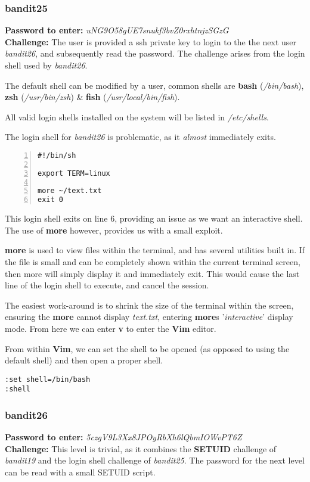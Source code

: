 \documentclass[a4paper]{article}
\newcommand{\pass}[1]{\textbf{Password to enter:} \textit{#1}\\}
\newcommand{\chall}{\textbf{Challenge:} }
\begin{document}
\subsubsection{bandit25}
\pass{uNG9O58gUE7snukf3bvZ0rxhtnjzSGzG}
\chall The user is provided a ssh private key to login to the the next user \textit{bandit26}, and subsequently read the password. The challenge arises from the login shell used by \textit{bandit26}.

The default shell can be modified by a user, common shells are \textbf{bash}  (\textit{/bin/bash}), \textbf{zsh} (\textit{/usr/bin/zsh}) \& \textbf{fish} (\textit{/usr/local/bin/fish}).

All valid login shells installed on the system will be listed in \textit{/etc/shells}.

The login shell for \textit{bandit26} is problematic, as it \textit{almost} immediately exits.
\begin{lstlisting}[title=login shell for bandit26\, /usr/bin/showtext, numbers=left]
#!/bin/sh

export TERM=linux

more ~/text.txt
exit 0
\end{lstlisting}

This login shell exits on line 6, providing an issue as we want an interactive shell. The use of \textbf{more} however, provides us with a small exploit.

\textbf{more} is used to view files within the terminal, and has several utilities built in. If the file is small and can be completely shown within the current terminal screen, then more will simply display it and immediately exit. This would cause the last line of the login shell to execute, and cancel the session.

The easiest work-around is to shrink the size of the terminal within the screen, ensuring the \textbf{more} cannot display \textit{text.txt}, entering \textbf{more}s '\textit{interactive}' display mode. From here we can enter \textbf{v} to enter the \textbf{Vim} editor.

From within \textbf{Vim}, we can set the shell to be opened (as opposed to using the default shell) and then open a proper shell.
\begin{lstlisting}[title=How to start a specific shell from vim, deletekeywords={set}]
:set shell=/bin/bash
:shell
\end{lstlisting}

\subsubsection{bandit26}
\pass{5czgV9L3Xx8JPOyRbXh6lQbmIOWvPT6Z}
\chall This level is trivial, as it combines the \textbf{SETUID} challenge of \textit{bandit19} and the login shell challenge of \textit{bandit25}. The password for the next level can be read with a small SETUID script.
\end{document}
